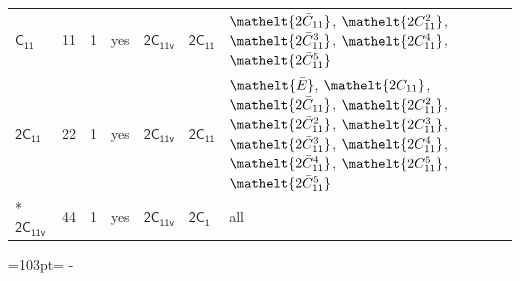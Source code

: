 \documentclass[10pt,a4paper]{article}
\newcommand{\needspace}[1]{\par\penalty-100\begingroup\dimen0=#1\relax\dimen2=\pagegoal
  \advance\dimen2-\pagetotal\ifdim\dimen0>\dimen2\relax\ifdim\dimen2>0pt\vfil\break\fi\fi
  \endgroup}
\numberwithin{equation}{section}
\newcommand{\eltfont}[1]{{\let\sigma\eltsigma\mathelt{#1}}}
\newcommand{\grp}[1]{\mathsf{#1}}
\newcommand{\cls}[1]{\eltfont{#1}}
\newcommand{\barred}[1]{\bar{#1}}
\newlength{\fillwidth}\newlength{\cellwidth}\newlength{\colwidth}
\begin{document}
{\begin{longtable}{@{}lrrlll>{\RaggedRight\arraybackslash}p{\fillwidth}@{}}
\href{C11.pdf}{$\grp{C_{11}}$} & 11 & 1 & yes & \href{2C11v.pdf}{$\grp{2C_{11v}}$} & \href{2C11.pdf}{$\grp{2C_{11}}$} & $\cls{2\barred{C}_{11}}$, $\cls{2C_{11}^{2}}$, $\cls{2\barred{C}_{11}^{3}}$, $\cls{2C_{11}^{4}}$, $\cls{2\barred{C}_{11}^{5}}$\\
\href{2C11.pdf}{$\grp{2C_{11}}$} & 22 & 1 & yes & \href{2C11v.pdf}{$\grp{2C_{11v}}$} & \href{2C11.pdf}{$\grp{2C_{11}}$} & $\cls{\barred{E}}$, $\cls{2C_{11}}$, $\cls{2\barred{C}_{11}}$, $\cls{2C_{11}^{2}}$, $\cls{2\barred{C}_{11}^{2}}$, $\cls{2C_{11}^{3}}$, $\cls{2\barred{C}_{11}^{3}}$, $\cls{2C_{11}^{4}}$, $\cls{2\barred{C}_{11}^{4}}$, $\cls{2C_{11}^{5}}$, $\cls{2\barred{C}_{11}^{5}}$\\*
\href{2C11v.pdf}{$\grp{2C_{11v}}$} & 44 & 1 & yes & \href{2C11v.pdf}{$\grp{2C_{11v}}$} & \href{2C1.pdf}{$\grp{2C_{1}}$} & all\\
\bottomrule\end{longtable}}
\needspace{103pt}
\end{document}
